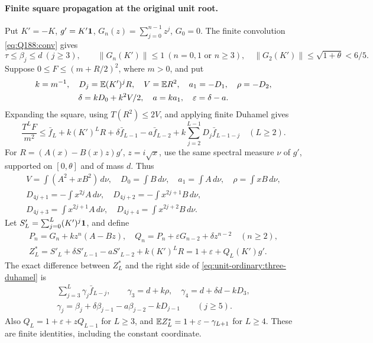 \paragraph{Finite square propagation at the original unit root.}
Put \(K'=-K\), \(g'=K'\mathbf1\), \(G_n(z)=\sum_{j=0}^{n-1}z^j\),
\(G_0=0\). The finite convolution \eqref{eq:Q188:conv} gives
\[
 \tau\le\beta_j\le d\ (j\ge3),\qquad
 \|G_n(K')\|\le1\ (n=0,1\text{ or }n\ge3),\quad
 \|G_2(K')\|\le\sqrt{1+\theta}<6/5.
\]
Suppose \(0\le F\le(m+R/2)^2\), where \(m>0\), and put
\[
\begin{gathered}
 k=m^{-1},\quad D_j=\mathbb E(K')^jR,\quad V=\mathbb E R^2,
 \quad a_1=-D_1,\quad\rho=-D_2,\\
 \delta=kD_0+k^2V/2,\quad a=ka_1,\quad\varepsilon=\delta-a.
\end{gathered}
\]
Expanding the square, using \(T(R^2)\le2V\), and applying finite
Duhamel gives
\begin{equation}\label{eq:unit-ordinary:three-duhamel}
 \frac{T^LF}{m^2}\le
 \bar f_L+k(K')^LR+\delta\bar f_{L-1}-a\bar f_{L-2}
       +k\sum_{j=2}^{L-1}D_j\bar f_{L-1-j}\quad(L\ge2).
\end{equation}
For \(R=(A(x)-B(x)z)g'\), \(z=i\sqrt x\), use the same
spectral measure \(\nu\) of \(g'\), supported on \([0,\theta]\)
and of mass \(d\). Thus
\begin{equation}\label{eq:unit-ordinary:three-moments}
 \begin{gathered}
 V=\int(A^2+xB^2)\,d\nu,\quad D_0=\int B\,d\nu,
 \quad a_1=\int A\,d\nu,\quad\rho=\int xB\,d\nu,\\
 D_{4j+1}=-\int x^{2j}A\,d\nu,\quad
 D_{4j+2}=-\int x^{2j+1}B\,d\nu,\\
 D_{4j+3}=\int x^{2j+1}A\,d\nu,\quad
 D_{4j+4}=\int x^{2j+2}B\,d\nu.
 \end{gathered}
\end{equation}
Let \(S'_L=\sum_{j=0}^L(K')^j\mathbf1\), and define
\[
 \begin{gathered}
 P_n=G_n+kz^n(A-Bz),\quad
 Q_n=P_n+\varepsilon G_{n-2}+\delta z^{n-2}\quad(n\ge2),\\
 Z_L^*=S'_L+\delta S'_{L-1}-aS'_{L-2}+k(K')^LR
       =1+\varepsilon+Q_L(K')g'.
 \end{gathered}
\]
The exact difference between \(Z_L^*\) and the right side of
\eqref{eq:unit-ordinary:three-duhamel} is
\begin{equation}\label{eq:unit-ordinary:three-losses}
 \begin{gathered}
 \sum_{j=3}^L\gamma_j\bar f_{L-j},\qquad
 \gamma_3=d+k\rho,\quad\gamma_4=d+\delta d-kD_3,\\
 \gamma_j=\beta_j+\delta\beta_{j-1}-a\beta_{j-2}-kD_{j-1}
 \qquad(j\ge5).
 \end{gathered}
\end{equation}
Also \(Q_L=1+\varepsilon+zQ_{L-1}\) for \(L\ge3\), and
\(\mathbb E Z_L^*=1+\varepsilon-\gamma_{L+1}\) for \(L\ge4\).
These are finite identities, including the constant coordinate.

